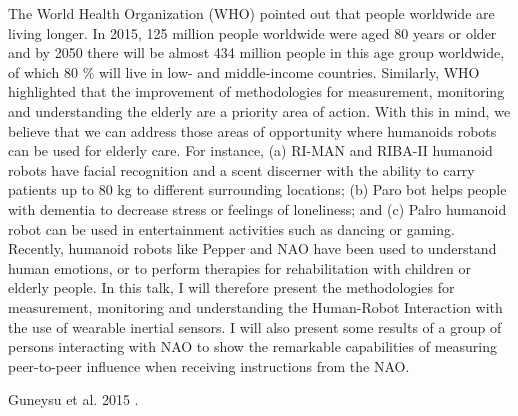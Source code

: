 \documentclass[a4paper]{article}
\begin{document}
The World Health Organization (WHO) pointed out that people worldwide are living longer.
In 2015, 125 million people worldwide were aged 80 years or older
and by 2050 there will be almost 434 million people in this age group worldwide,
 of which 80 \% will live in low- and middle-income countries.
Similarly, WHO highlighted that the improvement of methodologies for measurement,
monitoring and understanding the elderly are a priority area of action.
With this in mind, we believe that we can address those areas of opportunity
where humanoids robots can be used for elderly care.
For instance, (a) RI-MAN and RIBA-II  humanoid robots
have facial recognition and a scent discerner with the ability to
carry patients up to 80 kg to different surrounding locations;
(b) Paro bot helps people with dementia to decrease stress or feelings of loneliness; and
(c) Palro humanoid robot can be used in entertainment activities such as dancing or gaming.
Recently, humanoid robots like Pepper and NAO have been used to understand
human emotions, or to perform therapies for rehabilitation with children or
elderly people.
In this talk, I will therefore present the  methodologies for measurement,
monitoring and understanding the Human-Robot Interaction with the use of wearable
inertial sensors.
I will also present some results of a group of persons interacting with NAO
to show the remarkable capabilities of measuring peer-to-peer influence when
receiving instructions from the NAO.



Guneysu et al. 2015 \cite{guneysu2015children}.




\end{document}
